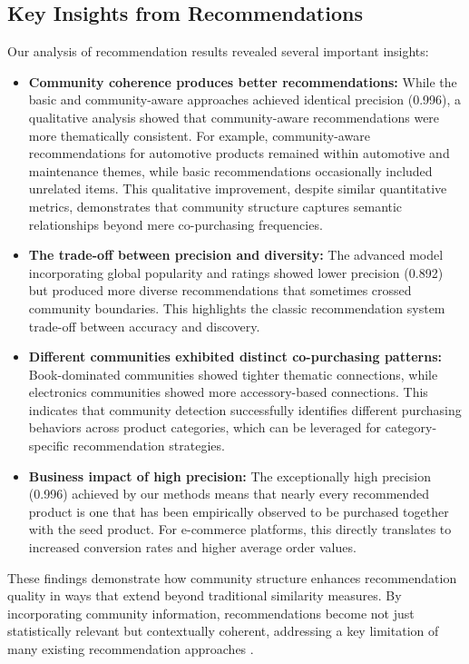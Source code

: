 \documentclass[conference]{IEEEtran}
\begin{document}
\subsection{Key Insights from Recommendations}
\label{sec:recommendation-insights}

Our analysis of recommendation results revealed several important insights:

\begin{itemize}
  \item \textbf{Community coherence produces better recommendations:} While the basic and community-aware approaches achieved identical precision (0.996), a qualitative analysis showed that community-aware recommendations were more thematically consistent. For example, community-aware recommendations for automotive products remained within automotive and maintenance themes, while basic recommendations occasionally included unrelated items. This qualitative improvement, despite similar quantitative metrics, demonstrates that community structure captures semantic relationships beyond mere co-purchasing frequencies.
  
  \item \textbf{The trade-off between precision and diversity:} The advanced model incorporating global popularity and ratings showed lower precision (0.892) but produced more diverse recommendations that sometimes crossed community boundaries. This highlights the classic recommendation system trade-off between accuracy and discovery.
  
  \item \textbf{Different communities exhibited distinct co-purchasing patterns:} Book-dominated communities showed tighter thematic connections, while electronics communities showed more accessory-based connections. This indicates that community detection successfully identifies different purchasing behaviors across product categories, which can be leveraged for category-specific recommendation strategies.
  
  \item \textbf{Business impact of high precision:} The exceptionally high precision (0.996) achieved by our methods means that nearly every recommended product is one that has been empirically observed to be purchased together with the seed product. For e-commerce platforms, this directly translates to increased conversion rates and higher average order values.
\end{itemize}

These findings demonstrate how community structure enhances recommendation quality in ways that extend beyond traditional similarity measures. By incorporating community information, recommendations become not just statistically relevant but contextually coherent, addressing a key limitation of many existing recommendation approaches \cite{shokrzadeh2022graph}.
\end{document}
